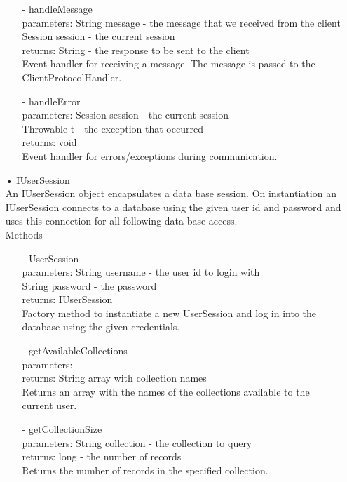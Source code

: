 \documentclass[oneside, english, final]{design}
\begin{document}
\begin{itemize}
\begin{itemize}
		      \item[-]handleMessage
		            \\parameters: String message - the message that we received from the client
		            \\Session session - the current session
		            \\returns: String - the response to be sent to the client
		            \\Event handler for receiving a message. The message is passed to the ClientProtocolHandler.

		      \item[-]handleError
		            \\parameters: Session session - the current session
		            \\Throwable t - the exception that occurred
		            \\returns: void
		            \\Event handler for errors/exceptions during communication.
	      \end{itemize}


	\item[•]IUserSession
	      \\An IUserSession object encapsulates a data base session.
	      On instantiation an IUserSession connects to a database using
	      the given user id and password and uses this connection for
	      all following data base access.
	      \\Methods
	      \begin{itemize}
		      \item[-]UserSession
		            \\parameters: String username - the user id to login with
		            \\String password - the password
		            \\returns: IUserSession
		            \\Factory method to instantiate a new UserSession and log in into the database using the given credentials.

		      \item[-]getAvailableCollections
		            \\parameters: -
		            \\returns: String array with collection names
		            \\Returns an array with the names of the collections available to the current user.

		      \item[-]getCollectionSize
		            \\parameters: String collection - the collection to query
		            \\returns: long - the number of records
		            \\Returns the number of records in the specified collection.


\end{itemize}
\end{itemize}
\end{document}
